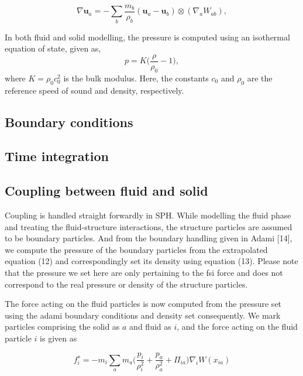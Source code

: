 \documentclass[preprint,12pt]{elsarticle}
\newcommand{\ten}[1]{\ensuremath{\mathbf{#1}}}
\begin{document}
\begin{equation}
  \label{eq:sph-vel-grad}
  \nabla \ten{u}_a =
  - \sum_{b} \frac{m_b}{\rho_{b}} (\ten{u}_{a} - \ten{u}_{b}) \otimes (\nabla_{a} W_{ab}),
\end{equation}


In both fluid and solid modelling, the pressure is computed using an
isothermal equation of state, given as,
\begin{equation}
  \label{eq:pressure-equation}
  p = K \bigg(\frac{\rho}{\rho_{0}} - 1 \bigg),
\end{equation}
where $K = \rho_{0} c_0^2$ is the bulk modulus. Here, the constants $c_0$ and
$\rho_0$ are the reference speed of sound and density, respectively.


\subsection{Boundary conditions}


\subsection{Time integration}


\subsection{Coupling between fluid and solid}
\label{subsec:fsi-coupling}

Coupling is handled straight forwardly in SPH. While modelling the fluid phase
and treating the fluid-structure interactions, the structure particles are
assumed to be boundary particles. And from the boundary handling given in
Adami [14], we compute the pressure of the boundary particles from the
extrapolated equation (12) and correspondingly set its density using equation
(13). Please note that the pressure we set here are only pertaining to the fsi
force and does not correspond to the real pressure or density of the structure
particles.

The force acting on the fluid particles is now computed from the pressure set
using the adami boundary conditions and density set consequently. We mark
particles comprising the solid as $a$ and fluid as $i$, and the force acting
on the fluid particle $i$ is given as

\begin{equation}
  f_i^s = -m_i \sum_{a} m_a \bigg(\frac{p_i}{\rho_{i}^2} +
  \frac{p_a}{\rho_{a}^2} + \Pi_{ia} \bigg) \nabla_{i} W(x_{ia})
\end{equation}
\end{document}

